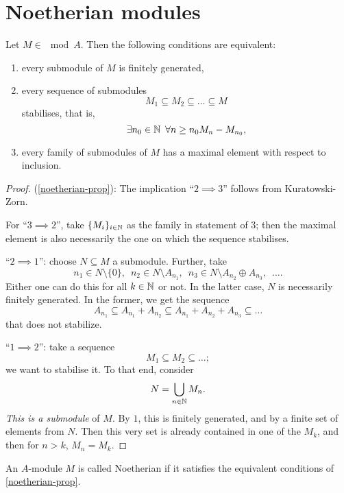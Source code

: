 \section{Noetherian modules}
\begin{prop}
  \label{noetherian-prop}
  Let $M \in \mod{A}$. Then the following conditions are equivalent:
  \begin{enumerate}
  \item every submodule of $M$ is finitely generated,
  \item every sequence of submodules
    \[ M_1 \subseteq M_2 \subseteq \ldots \subseteq M\]
    stabilises, that is,
    \[ \exists n_0 \in \mathbb N \enspace \forall n \geq n_0 M_n - M_{n_0},\]
  \item every family of submodules of $M$ has a maximal element with respect to inclusion.
  \end{enumerate}
\end{prop}

\begin{proof} (\cref{noetherian-prop}):
  The implication ``$2 \implies 3$'' follows from Kuratowski-Zorn.

  For ``$3 \implies 2$'', take $\{ M_i \}_{i \in \mathbb N}$ as the family in statement of 3; then the maximal element is also necessarily the one on which the sequence stabilises.

  ``$ 2 \implies 1$'': choose $N \subseteq M$ a submodule. Further, take
  \[ n_1 \in N \setminus \{ 0 \}, \enspace n_2 \in N \setminus A_{n_1}, \enspace n_3 \in N \setminus A_{n_2} \oplus A_{n_3}, \enspace \ldots.\]
  Either one can do this for all $k \in \mathbb N$ or not. In the latter case, $N$ is necessarily finitely generated. In the former, we get the sequence
  \[ A_{n_1} \subseteq A_{n_1} + A_{n_2} \subseteq A_{n_1} + A_{n_2} + A_{n_3} \subseteq \ldots \]
  that does not stabilize.

  ``$1 \implies 2$'': take a sequence
  \[ M_1 \subseteq M_2 \subseteq \ldots;\]
  we want to stabilise it. To that end, consider
  \[ N = \bigcup_{n \in \mathbb N} M_n.\]
  \textit{ This is a submodule} of $M$.
  By $1$, this is finitely generated, and by a finite set of elements from $N$. Then this very set is already contained in one of the $M_k$, and then for $n > k$, $M_n = M_k$.
\end{proof}

\begin{df}
  An $A$-module $M$ is called Noetherian if it satisfies the equivalent conditions of \cref{noetherian-prop}.
\end{df}


